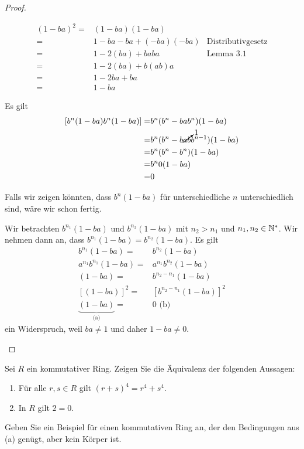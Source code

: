 \begin{proof}
	\begin{parts}
	\item 
		\begin{align*}
			(1-ba)^2=&(1-ba)(1-ba)\\
			=&1-ba-ba+(-ba)(-ba) & \text{Distributivgesetz}\\
			=&1-2(ba) + baba &\text{Lemma 3.1}\\
			=&1-2(ba)+b(ab)a\\
			=&1-2ba+ba\\
			=&1-ba
		\end{align*}
	\item Es gilt
		\begin{align*}
		\left[ b^n(1-ba)b^n(1-ba) \right] =& b^n (b^n -b ab^n)(1-ba)\\
		=&b^n(b^n -b\cancelto{1}{ab}b^{n-1})(1-ba)\\
		=&b^n(b^n-b^n)(1-ba)\\
		=&b^n 0 (1-ba)\\
		=& 0
		\end{align*}
	\item Falls wir zeigen könnten, dass $b^n(1-ba)$ f\"{u}r unterschiedliche $n$ unterschiedlich sind, wäre wir schon fertig. 

		Wir betrachten $b^{n_1}(1-ba)$ und $b^{n_2}(1-ba)$ mit $n_2>n_1$ und $n_1,n_2\in \mathbb{N}^*$. Wir nehmen dann an, dass $b^{n_1}(1-ba)=b^{n_2}(1-ba)$. Es gilt
		\begin{align*}
			b^{n_1}(1-ba)=& b^{n_2}(1-ba)\\
			a^{n_1}b^{n_1}(1-ba)=& a^{n_1}b^{n_2}(1-ba)\\
			(1-ba)=&b^{n_2-n_1}(1-ba)\\
			\left[ (1-ba) \right]^2=&\left[ b^{n_2-n_1}(1-ba) \right]^2\\
			\underbrace{(1-ba)}_\text{(a)}=&0\text{ (b)}
		\end{align*}
		ein Widerspruch, weil $ba\neq 1$ und daher $1-ba\neq 0$.\qedhere
	\end{parts}
\end{proof}
\begin{Problem}
\begin{parts}
\item Sei $R$ ein kommutativer Ring. Zeigen Sie die Äquivalenz der folgenden Aussagen:
	\begin{enumerate}[label=(\arabic*)]
		\item F\"{u}r alle $r,s\in R$ gilt $(r+s)^4=r^4+s^4$.
		\item In $R$ gilt $2=0$.
	\end{enumerate}
\item Geben Sie ein Beispiel für einen kommutativen Ring an, der den Bedingungen aus (a) genügt, aber kein Körper ist. 
\end{parts}
\end{Problem}
